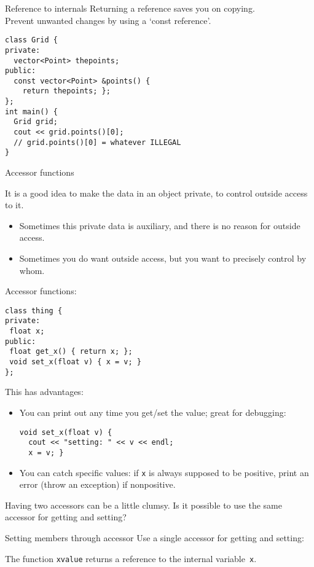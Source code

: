 \begin{block}{Reference to internals}
  \label{sl:obj-return-const-ref}
  Returning a reference saves you on copying.\\
  Prevent unwanted changes by using a `const reference'.
\begin{lstlisting}
class Grid {
private:
  vector<Point> thepoints;
public:
  const vector<Point> &points() {
    return thepoints; };
};
int main() {
  Grid grid;
  cout << grid.points()[0];
  // grid.points()[0] = whatever ILLEGAL
}
\end{lstlisting}
\end{block}

 {Accessor functions}

It is a good idea to make the data in an object private,
to control outside access to it.
\begin{itemize}
\item Sometimes this private data is auxiliary, and there is no reason
  for outside access.
\item Sometimes you do want outside access, but you want to precisely
  control by whom.
\end{itemize}

Accessor functions:
\begin{lstlisting}
class thing {
private:
 float x;
public:
 float get_x() { return x; };
 void set_x(float v) { x = v; }
};
\end{lstlisting}
This has advantages:
\begin{itemize}
\item You can print out any time you get/set the value; great for
  debugging:
\begin{lstlisting}
void set_x(float v) {
  cout << "setting: " << v << endl;
  x = v; }
\end{lstlisting}
\item You can catch specific values: if \lstinline{x} is always supposed to be
  positive, print an error (throw an exception) if nonpositive.
\end{itemize}

Having two accessors can be a little clumsy. Is it possible to use the
same accessor for getting and setting?

\begin{block}{Setting members through accessor}
  \label{sl:setmember}
  Use a single accessor for getting and setting:

  The function \lstinline{xvalue} returns a reference to the internal
  variable~\lstinline{x}.
\end{block}

